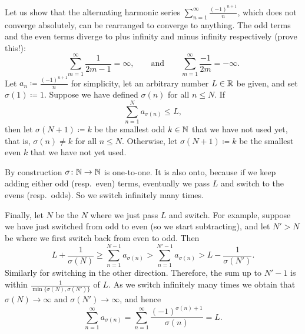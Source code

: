 \begin{example} \label{example:harmonsumanything}
Let us show that the alternating harmonic series
$\sum_{n=1}^\infty \frac{{(-1)}^{n+1}}{n}$, which does not converge absolutely, can be
rearranged to converge to anything.
The odd terms and the even terms diverge to
plus infinity and minus infinity respectively (prove this!):
\begin{equation*}
\sum_{m=1}^\infty \frac{1}{2m-1} = \infty, \qquad \text{and} \qquad
\sum_{m=1}^\infty \frac{-1}{2m} = -\infty .
\end{equation*}
Let $a_n \coloneqq \frac{{(-1)}^{n+1}}{n}$ for simplicity, 
let an arbitrary number $L \in {\mathbb{R}}$ be given, and set $\sigma(1) \coloneqq 1$.
Suppose we have
defined $\sigma(n)$ for all $n \leq N$.  If
\begin{equation*}
\sum_{n=1}^N a_{\sigma(n)} \leq L ,
\end{equation*}
then let $\sigma(N+1) \coloneqq k$ be the smallest odd $k \in {\mathbb{N}}$
that we have not used yet,
that is, $\sigma(n) \not= k$ for all $n \leq N$.
Otherwise, let $\sigma(N+1) \coloneqq k$ 
be the smallest even $k$ that we have not yet used.

By construction $\sigma \colon {\mathbb{N}} \to {\mathbb{N}}$ is one-to-one.
It is also onto, because if we keep adding either odd (resp.\ even) terms,
eventually we pass $L$ and switch
to the evens (resp.\ odds).  So we switch infinitely many times.

Finally, let $N$ be the $N$ where we just pass $L$ and switch.
For example, suppose we have just switched from odd to even (so we start
subtracting),
and let $N' > N$ be where we first switch back from even to odd.  Then
\begin{equation*}
L + \frac{1}{\sigma(N)} \geq \sum_{n=1}^{N-1} a_{\sigma(n)}
> \sum_{n=1}^{N'-1} a_{\sigma(n)} > L- \frac{1}{\sigma(N')}.
\end{equation*}
Similarly for switching in the other direction.  Therefore,
the sum up to $N'-1$ is within $\frac{1}{\min \{ \sigma(N), \sigma(N') \}}$
of $L$.  As
we switch infinitely many times we obtain that $\sigma(N) \to \infty$
and $\sigma(N') \to \infty$, and hence
\begin{equation*}
\sum_{n=1}^\infty a_{\sigma(n)} = 
\sum_{n=1}^\infty \frac{{(-1)}^{\sigma(n)+1}}{\sigma(n)} = L .
\end{equation*}


\end{example}
